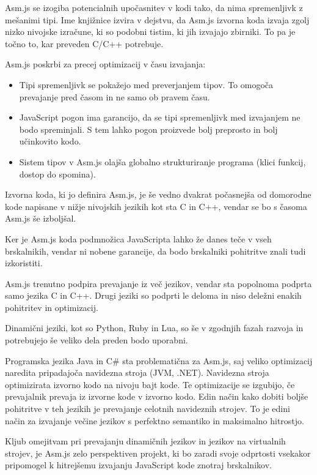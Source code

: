 Asm.js se izogiba potencialnih upočasnitev v kodi tako, da nima spremenljivk z mešanimi tipi. Ime knjižnice izvira v dejstvu, da Asm.js izvorna koda izvaja zgolj nizko nivojske izračune, ki so podobni tistim, ki jih izvajajo zbirniki. To pa je točno to, kar preveden C/C++ potrebuje.

Asm.js poskrbi za precej optimizacij v času izvajanja:

\begin{itemize}
\item Tipi spremenljivk se pokažejo med preverjanjem tipov. To omogoča prevajanje pred časom in ne samo ob pravem času.
\item JavaScript pogon ima garancijo, da se tipi spremenljivk med izvajanjem ne bodo spreminjali. S tem lahko pogon proizvede bolj preprosto in bolj učinkovito kodo. 
\item Sistem tipov v Asm.js olajša globalno strukturiranje programa (klici funkcij, dostop do spomina).
\end{itemize}

Izvorna koda, ki jo definira Asm.js, je še vedno dvakrat počasnejša od domorodne kode napisane v nižje nivojskih jezikih kot sta C in C++, vendar se bo s časoma Asm.js še izboljšal.

Ker je Asm.js koda podmnožica JavaScripta lahko že danes teče v vseh brskalnikih, vendar ni nobene garancije, da bodo brskalniki pohitritve znali tudi izkoristiti.

Asm.js trenutno podpira prevajanje iz več jezikov, vendar sta popolnoma podprta samo jezika C in C++. Drugi jeziki so podprti le deloma in niso deležni enakih pohitritev in optimizacij.

Dinamični jeziki, kot so Python, Ruby in Lua, so še v zgodnjih fazah razvoja in potrebujejo še veliko dela preden bodo uporabni.

Programska jezika Java in C\# sta problematična za Asm.js, saj veliko optimizacij naredita pripadajoča navidezna stroja (JVM, .NET). Navidezna stroja optimizirata izvorno kodo na nivoju bajt kode. Te optimizacije se izgubijo, če prevajalnik prevaja iz izvorne kode v izvorno kodo. Edin način kako dobiti boljše pohitritve v teh jezikih je prevajanje celotnih navideznih strojev. To je edini način za izvajanje večine jezikov s perfektno semantiko in maksimalno hitrostjo.

Kljub omejitvam pri prevajanju dinamičnih jezikov in jezikov na virtualnih strojev, je Asm.js zelo perspektiven projekt, ki bo zaradi svoje odprtosti vsekakor pripomogel k hitrejšemu izvajanju JavaScript kode znotraj brskalnikov.
